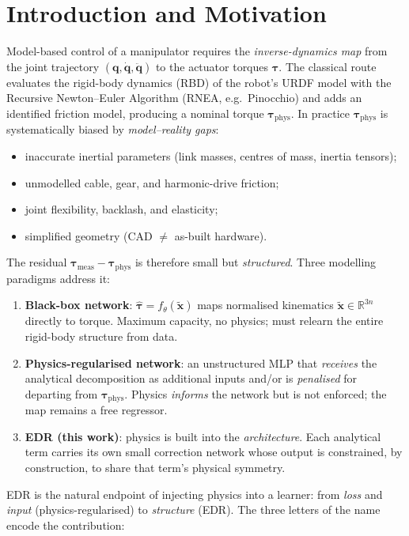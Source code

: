 \documentclass[11pt]{article}
\newcommand{\R}{\mathbb{R}}
\newcommand{\q}{\bm{q}}
\newcommand{\qd}{\dot{\bm{q}}}
\newcommand{\qdd}{\ddot{\bm{q}}}
\newcommand{\tphys}{\bm{\tau}_{\mathrm{phys}}}
\newcommand{\that}{\hat{\bm{\tau}}}
\theoremstyle{definition}
\theoremstyle{plain}
\begin{document}
\section{Introduction and Motivation}
Model-based control of a manipulator requires the \emph{inverse-dynamics map}
from the joint trajectory $(\q,\qd,\qdd)$ to the actuator torques $\bm{\tau}$. The
classical route evaluates the rigid-body dynamics (RBD) of the robot's URDF model
with the Recursive Newton--Euler Algorithm (RNEA, e.g.\ Pinocchio) and adds an
identified friction model, producing a nominal torque $\tphys$. In practice
$\tphys$ is systematically biased by \emph{model--reality gaps}:
\begin{itemize}[leftmargin=1.6em,itemsep=1pt]
  \item inaccurate inertial parameters (link masses, centres of mass, inertia tensors);
  \item unmodelled cable, gear, and harmonic-drive friction;
  \item joint flexibility, backlash, and elasticity;
  \item simplified geometry (CAD $\neq$ as-built hardware).
\end{itemize}
The residual $\bm{\tau}_{\mathrm{meas}}-\tphys$ is therefore small but
\emph{structured}. Three modelling paradigms address it:
\begin{enumerate}[leftmargin=2em,itemsep=2pt]
  \item \textbf{Black-box network}: $\that=f_\theta(\tilde{\bm{x}})$ maps
  normalised kinematics $\tilde{\bm{x}}\in\R^{3n}$ directly to torque. Maximum
  capacity, no physics; must relearn the entire rigid-body structure from data.
  \item \textbf{Physics-regularised network}: an unstructured MLP that
  \emph{receives} the analytical decomposition as additional inputs and/or is
  \emph{penalised} for departing from $\tphys$. Physics \emph{informs} the
  network but is not enforced; the map remains a free regressor.
  \item \textbf{EDR (this work)}: physics is built into the \emph{architecture}.
  Each analytical term carries its own small correction network whose output is
  constrained, by construction, to share that term's physical symmetry.
\end{enumerate}
EDR is the natural endpoint of injecting physics into a learner: from \emph{loss}
and \emph{input} (physics-regularised) to \emph{structure} (EDR). The three
letters of the name encode the contribution:
\end{document}
